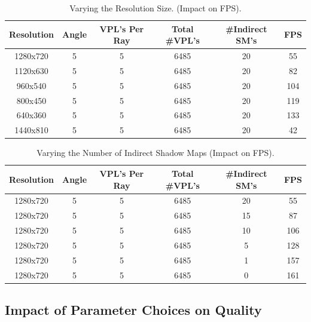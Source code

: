 \begin{table}[h!]\centering
	\caption{Varying the Resolution Size. (Impact on FPS).}
	\begin{center}
	    \begin{tabular}{ | c | c | c | c | c | c |}
	    \hline
	    Resolution & Angle & VPL's Per Ray & Total \#VPL's & \#Indirect SM's & FPS\\ \hline
	    1280x720 & 5 & 5 & 6485 & 20 & 55\\ \hline
	    1120x630 & 5 & 5 & 6485 & 20 & 82\\ \hline
	    960x540 & 5 & 5 & 6485 & 20 & 104\\ \hline
	    800x450 & 5 & 5 & 6485 & 20 & 119\\ \hline
	    640x360 & 5 & 5 & 6485 & 20 & 133\\ \hline
	    1440x810 & 5 & 5 & 6485 & 20 & 42\\ \hline
	    \end{tabular}
	\end{center}
	\label{table:5.3}
\end{table}

\begin{table}[h!]\centering
	\caption{Varying the Number of Indirect Shadow Maps (Impact on FPS).}
	\begin{center}
	    \begin{tabular}{ | c | c | c | c | c | c |}
	    \hline
	    Resolution & Angle & VPL's Per Ray & Total \#VPL's & \#Indirect SM's & FPS\\ \hline
	    1280x720 & 5 & 5 & 6485 & 20 & 55\\ \hline
	    1280x720 & 5 & 5 & 6485 & 15 & 87\\ \hline
	    1280x720 & 5 & 5 & 6485 & 10 & 106\\ \hline
	    1280x720 & 5 & 5 & 6485 & 5 & 128\\ \hline
	    1280x720 & 5 & 5 & 6485 & 1 & 157\\ \hline
	    1280x720 & 5 & 5 & 6485 & 0 & 161\\ \hline
	    \end{tabular}
	\end{center}
	\label{table:5.4}
\end{table}

\subsection{Impact of Parameter Choices on Quality} \label{sec:quality}
